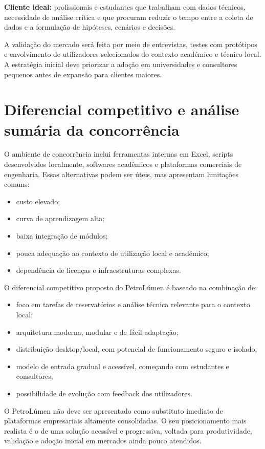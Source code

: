 \documentclass[11pt,a4paper]{article}
\begin{document}
\textbf{Cliente ideal:} profissionais e estudantes que trabalham com dados técnicos, necessidade de análise crítica e que procuram reduzir o tempo entre a coleta de dados e a formulação de hipóteses, cenários e decisões.

A validação do mercado será feita por meio de entrevistas, testes com protótipos e envolvimento de utilizadores selecionados do contexto académico e técnico local. A estratégia inicial deve priorizar a adoção em universidades e consultores pequenos antes de expansão para clientes maiores.

\section{Diferencial competitivo e análise sumária da concorrência}
O ambiente de concorrência inclui ferramentas internas em Excel, scripts desenvolvidos localmente, softwares acadêmicos e plataformas comerciais de engenharia. Essas alternativas podem ser úteis, mas apresentam limitações comuns:

\begin{itemize}
    \item custo elevado;
    \item curva de aprendizagem alta;
    \item baixa integração de módulos;
    \item pouca adequação ao contexto de utilização local e académico;
    \item dependência de licenças e infraestruturas complexas.
\end{itemize}

O diferencial competitivo proposto do PetroLúmen é baseado na combinação de:

\begin{itemize}
    \item foco em tarefas de reservatórios e análise técnica relevante para o contexto local;
    \item arquitetura moderna, modular e de fácil adaptação;
    \item distribuição desktop/local, com potencial de funcionamento seguro e isolado;
    \item modelo de entrada gradual e acessível, começando com estudantes e consultores;
    \item possibilidade de evolução com feedback dos utilizadores.
\end{itemize}

O PetroLúmen não deve ser apresentado como substituto imediato de plataformas empresariais altamente consolidadas. O seu posicionamento mais realista é o de uma solução acessível e progressiva, voltada para produtividade, validação e adoção inicial em mercados ainda pouco atendidos.
\end{document}
